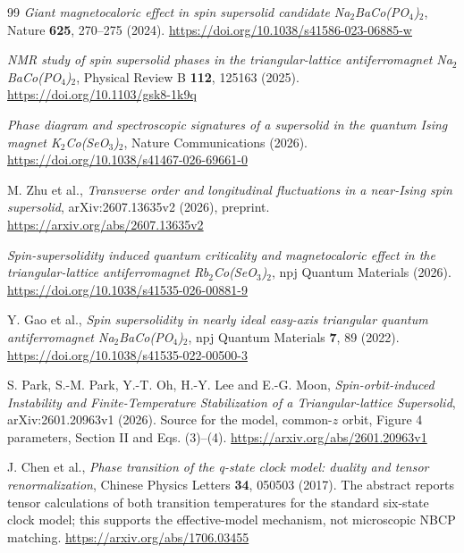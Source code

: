 \clearpage
{}\label{references}
\renewcommand{\refname}{References and Source Roles}
\begin{thebibliography}{99}
\emph{Giant magnetocaloric effect in spin supersolid candidate Na$_2$BaCo(PO$_4$)$_2$}, Nature \textbf{625}, 270--275 (2024).
\url{https://doi.org/10.1038/s41586-023-06885-w}

\emph{NMR study of spin supersolid phases in the triangular-lattice antiferromagnet Na$_2$BaCo(PO$_4$)$_2$}, Physical Review B \textbf{112}, 125163 (2025).
\url{https://doi.org/10.1103/gsk8-1k9q}

\emph{Phase diagram and spectroscopic signatures of a supersolid in the quantum Ising magnet K$_2$Co(SeO$_3$)$_2$}, Nature Communications (2026).
\url{https://doi.org/10.1038/s41467-026-69661-0}

M. Zhu et al., \emph{Transverse order and longitudinal fluctuations in a near-Ising spin supersolid}, arXiv:2607.13635v2 (2026), preprint.
\url{https://arxiv.org/abs/2607.13635v2}

\emph{Spin-supersolidity induced quantum criticality and magnetocaloric effect in the triangular-lattice antiferromagnet Rb$_2$Co(SeO$_3$)$_2$}, npj Quantum Materials (2026).
\url{https://doi.org/10.1038/s41535-026-00881-9}

Y. Gao et al., \emph{Spin supersolidity in nearly ideal easy-axis triangular quantum antiferromagnet Na$_2$BaCo(PO$_4$)$_2$}, npj Quantum Materials \textbf{7}, 89 (2022).
\url{https://doi.org/10.1038/s41535-022-00500-3}

S. Park, S.-M. Park, Y.-T. Oh, H.-Y. Lee and E.-G. Moon, \emph{Spin-orbit-induced Instability and Finite-Temperature Stabilization of a Triangular-lattice Supersolid}, arXiv:2601.20963v1 (2026). Source for the model, common-$z$ orbit, Figure 4 parameters, Section II and Eqs. (3)--(4).
\url{https://arxiv.org/abs/2601.20963v1}

J. Chen et al., \emph{Phase transition of the q-state clock model: duality and tensor renormalization}, Chinese Physics Letters \textbf{34}, 050503 (2017). The abstract reports tensor calculations of both transition temperatures for the standard six-state clock model; this supports the effective-model mechanism, not microscopic NBCP matching.
\url{https://arxiv.org/abs/1706.03455}


\end{thebibliography}
